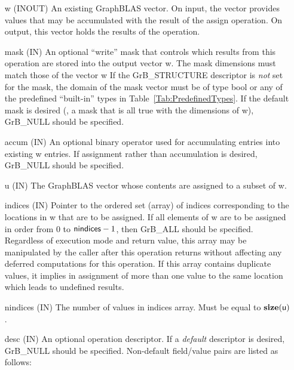 \begin{itemize}[leftmargin=1.1in]
    \item[{\sf w}]    ({\sf INOUT}) An existing GraphBLAS vector.  On input,
    the vector provides values that may be accumulated with the result of the
    assign operation.  On output, this vector holds the results of the
    operation.

    \item[{\sf mask}] ({\sf IN}) An optional ``write'' mask that controls which
    results from this operation are stored into the output vector {\sf w}. The 
    mask dimensions must match those of the vector {\sf w} If the 
    {\sf GrB\_STRUCTURE} descriptor is {\em not} set for the mask, the domain of the
    {\sf mask} vector must be of type {\sf bool} or any of the predefined 
    ``built-in'' types in Table~\ref{Tab:PredefinedTypes}.  If the default
    mask is desired (\ie, a mask that is all {\sf true} with the dimensions of {\sf w}), 
    {\sf GrB\_NULL} should be specified.

    \item[{\sf accum}] ({\sf IN}) An optional binary operator used for accumulating
    entries into existing {\sf w} entries. If assignment rather than accumulation is
    desired, {\sf GrB\_NULL} should be specified.

    \item[{\sf u}]    ({\sf IN}) The GraphBLAS vector whose contents are 
    assigned to a subset of {\sf w}.

    \item[{\sf indices}]  ({\sf IN}) Pointer to the ordered set (array) of 
    indices corresponding to the locations in {\sf w} that are to be assigned.  
    If all elements of {\sf w} are to be assigned in order from $0$ to 
    ${\sf nindices} - 1$, then {\sf GrB\_ALL} should be specified.  Regardless of 
    execution mode and return value, this array may be manipulated by the caller
    after this operation returns without affecting any deferred computations for 
    this operation.  
    If this array contains duplicate values, it implies in assignment of more 
    than one value to the same location which leads to undefined results.
    
    \item[{\sf nindices}] ({\sf IN}) The number of values in {\sf indices} array.
    Must be equal to $\bold{size}({\sf u})$.

    \item[{\sf desc}] ({\sf IN}) An optional operation descriptor. If
    a \emph{default} descriptor is desired, {\sf GrB\_NULL} should be
    specified. Non-default field/value pairs are listed as follows:  \\


\end{itemize}
